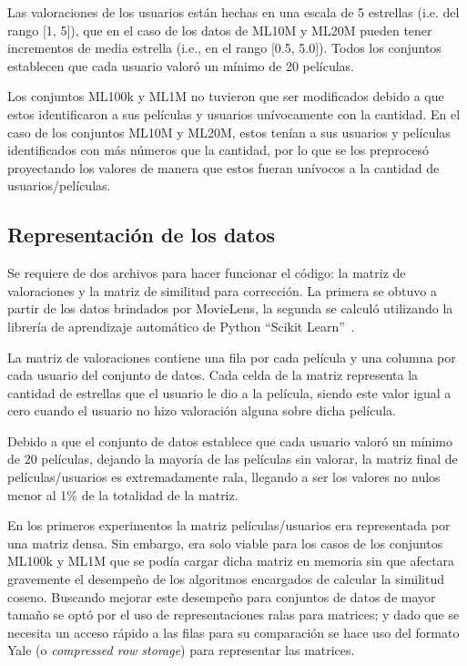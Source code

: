 \documentclass[11pt, a4paper]{article}
\begin{document}
  Las valoraciones de los usuarios están hechas en una escala de 5 estrellas
  (i.e. del rango [1, 5]), que en el caso de los datos de ML10M y ML20M pueden
  tener incrementos de media estrella (i.e., en el rango [0.5, 5.0]). Todos los
  conjuntos establecen que cada usuario valoró un mínimo de 20 películas.

  Los conjuntos ML100k y ML1M no tuvieron que ser modificados debido a que
  estos identificaron a sus películas y usuarios unívocamente con la cantidad.
  En el caso de los conjuntos ML10M y ML20M, estos tenían a sus usuarios y
  películas identificados con más números que la cantidad, por lo que se los
  preprocesó proyectando los valores de manera que estos fueran unívocos a la
  cantidad de usuarios/películas.

  \subsection{Representación de los datos}

  Se requiere de dos archivos para hacer funcionar el código: la matriz de
  valoraciones y la matriz de similitud para corrección. La primera se obtuvo a
  partir de los datos brindados por MovieLens, la segunda se calculó utilizando
  la librería de aprendizaje automático de Python ``Scikit
  Learn''~\cite{scikit-learn}.

  La matriz de valoraciones contiene una fila por cada película y una columna
  por cada usuario del conjunto de datos.  Cada celda de la matriz representa
  la cantidad de estrellas que el usuario le dio a la película, siendo este
  valor igual a cero cuando el usuario no hizo valoración alguna sobre dicha
  película.

  Debido a que el conjunto de datos establece que cada usuario valoró un mínimo
  de 20 películas, dejando la mayoría de las películas sin valorar, la matriz
  final de películas/usuarios es extremadamente rala, llegando a ser los
  valores no nulos menor al 1\% de la totalidad de la matriz.

  En los primeros experimentos la matriz películas/usuarios era representada
  por una matriz densa. Sin embargo, era solo viable para los casos de los
  conjuntos ML100k y ML1M que se podía cargar dicha matriz en memoria sin que
  afectara gravemente el desempeño de los algoritmos encargados de calcular la
  similitud coseno. Buscando mejorar este desempeño para conjuntos de datos de
  mayor tamaño se optó por el uso de representaciones ralas para matrices; y
  dado que se necesita un acceso rápido a las filas para su comparación se hace
  uso del formato Yale (o {\em compressed row storage}) para representar las
  matrices.
  
\end{document}

